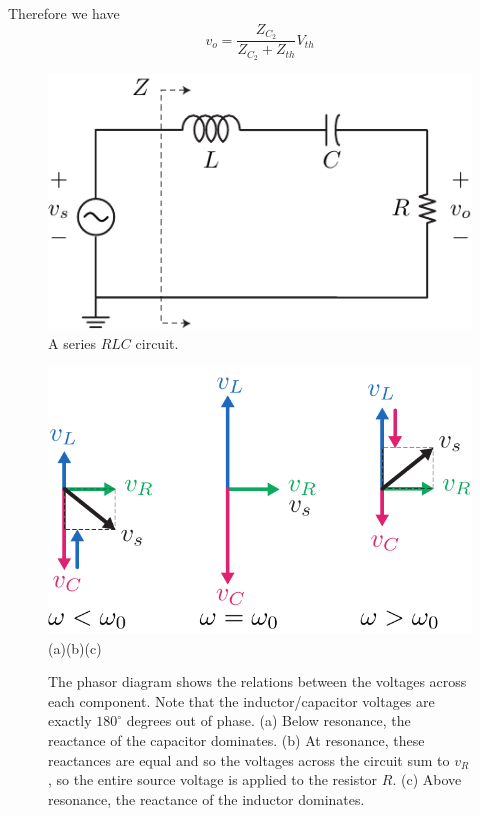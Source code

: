 Therefore we have  
    \begin{equation}
        v_o = \frac{Z_{C_2}}{Z_{C_2} + Z_{th}} V_{th} 
    \end{equation}
\begin{figure}[tb]
\centering
\includegraphics[scale=1]{rlc}
\caption{A series $RLC$ circuit.}
\label{fig:rlc}
\end{figure}
\begin{figure}[H]
\centering
\includegraphics[scale=.95]{rlcphasor}\\
(a)\hspace{3.5cm}(b)\hspace{3.3cm}(c)
\caption{The phasor diagram shows the relations between the voltages across each component.  Note that the inductor/capacitor voltages are exactly $180^\circ$ degrees out of phase.  (a) Below resonance, the reactance of the capacitor dominates.  (b) At resonance, these reactances are equal and so the voltages across the circuit sum to $v_R$, so the entire source voltage is applied to the resistor $R$.  (c) Above resonance, the reactance of the inductor dominates.}
\label{fig:rlcphasor}
\end{figure}
